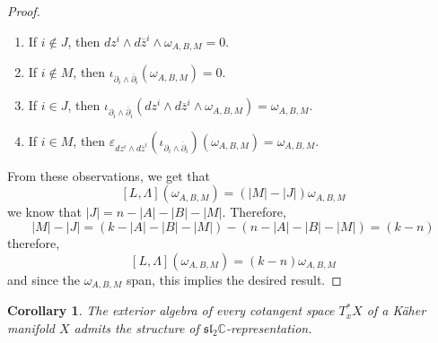 \documentclass[psamsfonts, 12pt]{amsart}
\newtheorem{cor}[thm]{Corollary}
\theoremstyle{definition}
\theoremstyle{remark}
\renewcommand{\sl}{\mathfrak{sl}}
\newcommand{\C}{\mathbb{C}}
\newcommand{\dbar}{\overline{\partial}}
\newcommand{\zbar}{\overline{z}}
\begin{document}
\begin{proof}
\begin{enumerate}
  \item If $i \notin J$, then $dz^i\wedge d\zbar^i \wedge \omega_{A,B,M} = 0$.
  \item If $i \notin M$, then $\iota_{\partial_i\wedge\dbar_i}(\omega_{A,B,M}) = 0$.
  \item If $i \in J$, then
  $\iota_{\partial_i\wedge\dbar_i}(dz^i\wedge d\zbar^i\wedge\omega_{A,B,M})
  = \omega_{A,B,M}$.
  \item If $i \in M$, then
  $\varepsilon_{dz^i\wedge d\zbar^i}(\iota_{\partial_i\wedge\dbar_i})(\omega_{A,B,M})
  = \omega_{A,B,M}$.
\end{enumerate}
From these observations, we get that
\[
[L,\Lambda](\omega_{A,B,M}) = (|M|-|J|)\omega_{A,B,M}
\]
we know that $|J| = n - |A| - |B| - |M|$. Therefore,
\[
|M| - |J| = (k - |A| - |B| - |M|) - (n - |A| - |B| - |M|) = (k-n)
\]
therefore,
\[
[L,\Lambda](\omega_{A,B,M}) = (k-n)\omega_{A,B,M}
\]
and since the $\omega_{A,B,M}$ span, this implies the desired result.
\end{proof}
%
\begin{cor}
The exterior algebra of every cotangent space $T^*_xX$ of a K\"aher manifold $X$ admits
the structure of $\sl_2\C$-representation.
\end{cor}
%
\end{document}
